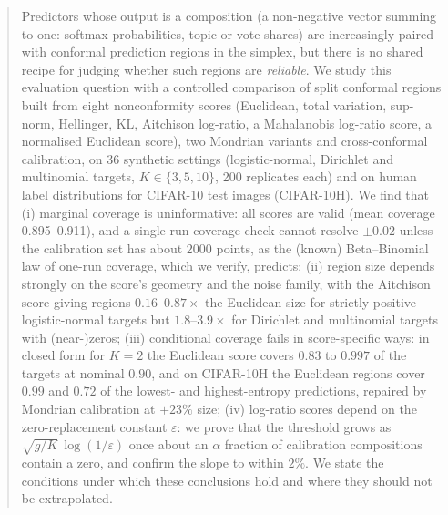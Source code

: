 \documentclass{article}
\theoremstyle{plain}
\theoremstyle{remark}
\begin{document}

\printAffiliationsAndNotice{}

\begin{abstract}
Predictors whose output is a composition (a non-negative vector summing to one: softmax probabilities, topic or vote shares) are increasingly paired with conformal prediction regions in the simplex, but there is no shared recipe for judging whether such regions are \emph{reliable}. We study this evaluation question with a controlled comparison of split conformal regions built from eight nonconformity scores (Euclidean, total variation, sup-norm, Hellinger, KL, Aitchison log-ratio, a Mahalanobis log-ratio score, a normalised Euclidean score), two Mondrian variants and cross-conformal calibration, on 36 synthetic settings (logistic-normal, Dirichlet and multinomial targets, $K\in\{3,5,10\}$, 200 replicates each) and on human label distributions for CIFAR-10 test images (CIFAR-10H). We find that (i) marginal coverage is uninformative: all scores are valid (mean coverage 0.895--0.911), and a single-run coverage check cannot resolve $\pm0.02$ unless the calibration set has about $2000$ points, as the (known) Beta--Binomial law of one-run coverage, which we verify, predicts; (ii) region size depends strongly on the score's geometry and the noise family, with the Aitchison score giving regions $0.16$--$0.87\times$ the Euclidean size for strictly positive logistic-normal targets but $1.8$--$3.9\times$ for Dirichlet and multinomial targets with (near-)zeros; (iii) conditional coverage fails in score-specific ways: in closed form for $K{=}2$ the Euclidean score covers $0.83$ to $0.997$ of the targets at nominal $0.90$, and on CIFAR-10H the Euclidean regions cover $0.99$ and $0.72$ of the lowest- and highest-entropy predictions, repaired by Mondrian calibration at $+23\%$ size; (iv) log-ratio scores depend on the zero-replacement constant $\varepsilon$: we prove that the threshold grows as $\sqrt{g/K}\,\log(1/\varepsilon)$ once about an $\alpha$ fraction of calibration compositions contain a zero, and confirm the slope to within $2\%$. We state the conditions under which these conclusions hold and where they should not be extrapolated.
\end{abstract}
\end{document}
